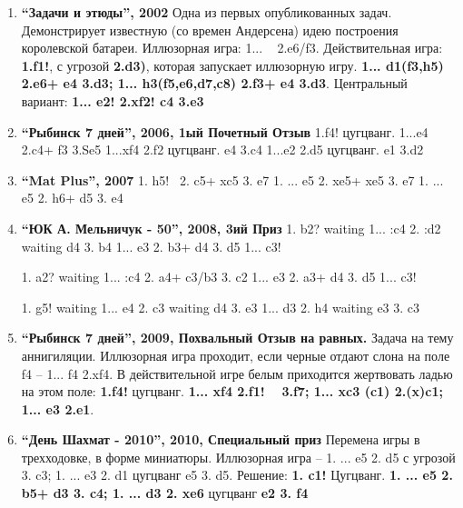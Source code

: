 \begin{enumerate}
\item \textbf{ ``Задачи и этюды'', 2002 } Одна из первых опубликованных задач. Демонстрирует известную (со времен Андерсена) идею построения королевской батареи. Иллюзорная игра: 1... \bishop{}~ 2.\knight{}e6/f3\mate{}. Действительная игра:  \textbf{1.\bishop{}f1!}, с угрозой \textbf{2.\bishop{}d3)}, которая запускает иллюзорную игру.  \textbf{1... \bishop{}d1(f3,h5) 2.\knight{}e6+ \king{}e4 3.\bishop{}d3\mate{}; 1... \bishop{}h3(f5,e6,d7,c8) 2.\knight{}f3+ \king{}e4 3.\bishop{}d3\mate{}}. Центральный вариант: \textbf{1... \bishop{}e2! 2.\king{}xf2! \king{}c4 3.\king{}e3\mate{}}
   
\item \textbf{ ``Рыбинск 7 дней'', 2006, 1ый Почетный Отзыв } 1.\bishop{}f4! цугцванг.
      1...\king{}e4 2.\queen{}c4+ \king{}f3 3.Se5 \mate{} 
      1...\king{}xf4 2.\king{}f2 цугцванг. \king{}e4 3.\queen{}c4 \mate{} 
      1...\king{}e2 2.\queen{}d5 цугцванг. \king{}e1 3.\queen{}d2 \mate{}
                  
\item \textbf{ ``Mat Plus'', 2007 } 1. \rook{}h5! ~2. \queen{}c5+ \king{}xc5 3. \bishop{}e7\mate{}
  1. ... \bishop{}e5 2. \queen{}xe5+ \king{}xe5 3. \bishop{}e7\mate{}
  1. ... e5 2. \rook{}h6+ \king{}d5 3. e4\mate{}
  
\item \textbf{ ``ЮК А. Мельничук - 50'', 2008, 3ий Приз } 1. \rook{}b2? waiting
1... \king{}:c4 2. \king{}:d2 waiting \king{}d4 3. \rook{}b4\mate{}
1... \king{}e3 2. \rook{}b3+ \king{}d4 3. \queen{}d5\mate{}
1... \king{}c3! 

1. \rook{}a2? waiting
1... \king{}:c4 2. \rook{}a4+ \king{}c3/b3 3. \queen{}c2\mate{}
1... \king{}e3 2. \rook{}a3+ \king{}d4 3. \queen{}d5\mate{}
1... \king{}c3! 

1. \queen{}g5! waiting
1... \king{}e4 2. \rook{}c3 waiting \king{}d4 3. \queen{}e3\mate{}
1... \king{}d3 2. \queen{}h4 waiting \king{}e3 3. \rook{}c3\mate{}

\item \textbf{ ``Рыбинск 7 дней'', 2009, Похвальный Отзыв на равных. } Задача на тему аннигиляции. Иллюзорная игра проходит, если черные отдают слона на поле f4 -- 1... \bishop{}f4 2.\rook{}xf4. В действительной игре белым приходится жертвовать ладью на этом поле: \textbf{ 1.\rook{}f4!} цугцванг. \textbf{ 1... \bishop{}xf4 2.\queen{}f1! \bishop{}~ 3.\queen{}f7\mate{}; 1... \bishop{}xc3 (c1) 2.\queen{}(x)c1; 1... \bishop{}e3 2.\queen{}e1}.
  
\item \textbf{ ``День Шахмат - 2010'', 2010, Специальный приз } Перемена игры в трехходовке, в форме миниатюры. Иллюзорная игра -- 1. ... e5 2. \knight{}d5 с угрозой 3. \queen{}c3\mate{}; 1. ... \king{}e3 2. \queen{}d1 цугцванг e5 3. \knight{}d5\mate{}. Решение: \textbf{ 1. \queen{}c1!} Цугцванг. \textbf{ 1. ... e5 2. \knight{}b5+ \king{}d3 3. \bishop{}c4\mate{};  1. ... \king{}d3 2. \knight{}xe6} цугцванг \textbf{\king{}e2 3. \knight{}f4\mate{}}


\end{enumerate}
